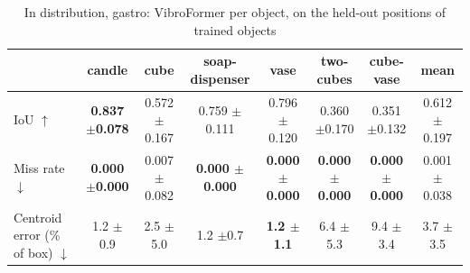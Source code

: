 \begin{table}
\caption{In distribution, gastro: VibroFormer per object, on the held-out positions of trained objects}
\label{tab:id_gastro}
\begin{tabular}{l!{\vrule width 1.2pt}cccccc!{\vrule width 1.2pt}c}
\toprule
 & candle & cube & soap-dispenser & vase & two-cubes & cube-vase & mean \\
\midrule
IoU $\uparrow$ & \bfseries 0.837 {\scriptsize $\pm$0.078} & 0.572 {\scriptsize $\pm$0.167} & 0.759 {\scriptsize $\pm$0.111} & 0.796 {\scriptsize $\pm$0.120} & 0.360 {\scriptsize $\pm$0.170} & 0.351 {\scriptsize $\pm$0.132} & 0.612 {\scriptsize $\pm$0.197} \\
Miss rate $\downarrow$ & \bfseries 0.000 {\scriptsize $\pm$0.000} & 0.007 {\scriptsize $\pm$0.082} & \bfseries 0.000 {\scriptsize $\pm$0.000} & \bfseries 0.000 {\scriptsize $\pm$0.000} & \bfseries 0.000 {\scriptsize $\pm$0.000} & \bfseries 0.000 {\scriptsize $\pm$0.000} & 0.001 {\scriptsize $\pm$0.038} \\
Centroid error (\% of box) $\downarrow$ & 1.2 {\scriptsize $\pm$0.9} & 2.5 {\scriptsize $\pm$5.0} & 1.2 {\scriptsize $\pm$0.7} & \bfseries 1.2 {\scriptsize $\pm$1.1} & 6.4 {\scriptsize $\pm$5.3} & 9.4 {\scriptsize $\pm$3.4} & 3.7 {\scriptsize $\pm$3.5} \\
\bottomrule
\end{tabular}
\end{table}
